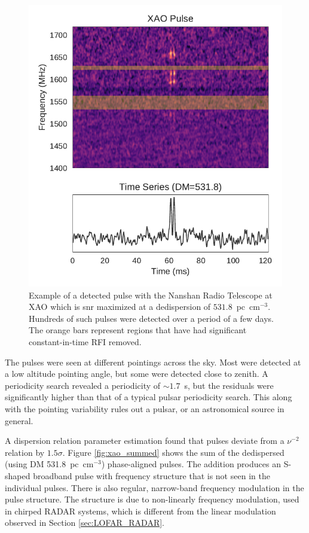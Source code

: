 \documentclass[a4paper,fleqn,usenatbib]{mnras}
\begin{document}
\begin{figure}
    \includegraphics[width=1.0\linewidth]{figures/XAO_pulse_dynamic.pdf}
    \caption{Example of a detected pulse with the Nanshan Radio Telescope at XAO
    which is \gls{snr} maximized at a dedispersion of $531.8$~pc~cm$^{-3}$. Hundreds
    of such pulses were detected over a period of a few days. The orange bars
    represent regions that have had significant constant-in-time RFI removed.
    }
    \label{fig:xao_dynamic}
\end{figure}

The pulses were seen at different pointings across the sky. Most were detected
at a low altitude pointing angle, but some were detected close to zenith.  A
periodicity search revealed a periodicity of $\sim 1.7$~s, but the residuals
were significantly higher than that of a typical pulsar periodicity search. This
along with the pointing variability rules out a pulsar, or an astronomical
source in general.

A dispersion relation parameter estimation found that pulses deviate from a
$\nu^{-2}$ relation by $1.5 \sigma$.  Figure \ref{fig:xao_summed} shows the sum
of the dedispersed (using DM 531.8~pc~cm$^{-3}$) phase-aligned pulses.  The
addition produces an S-shaped broadband pulse with frequency structure that is
not seen in the individual pulses.  There is also regular, narrow-band frequency
modulation in the pulse structure.  The structure is due to non-linearly
frequency modulation, used in chirped RADAR systems, which is different from the
linear modulation observed in Section \ref{sec:LOFAR_RADAR}.
\end{document}
